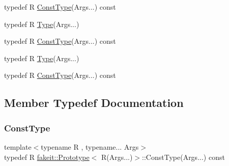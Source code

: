 \begin{DoxyCompactItemize}
\item 
typedef R \mbox{\hyperlink{structfakeit_1_1Prototype_3_01R_07Args_8_8_8_08_4_ae3e717bc1f9c549d4517139ae932049e}{Const\+Type}}(Args...) const
\item 
typedef R \mbox{\hyperlink{structfakeit_1_1Prototype_3_01R_07Args_8_8_8_08_4_ab60f23ae5c02a3a715e1b7d959a1f502}{Type}}(Args...)
\item 
typedef R \mbox{\hyperlink{structfakeit_1_1Prototype_3_01R_07Args_8_8_8_08_4_ae3e717bc1f9c549d4517139ae932049e}{Const\+Type}}(Args...) const
\item 
typedef R \mbox{\hyperlink{structfakeit_1_1Prototype_3_01R_07Args_8_8_8_08_4_ab60f23ae5c02a3a715e1b7d959a1f502}{Type}}(Args...)
\item 
typedef R \mbox{\hyperlink{structfakeit_1_1Prototype_3_01R_07Args_8_8_8_08_4_ae3e717bc1f9c549d4517139ae932049e}{Const\+Type}}(Args...) const
\end{DoxyCompactItemize}


\subsection{Member Typedef Documentation}
\mbox{\label{structfakeit_1_1Prototype_3_01R_07Args_8_8_8_08_4_ae3e717bc1f9c549d4517139ae932049e}} 
\subsubsection{\texorpdfstring{ConstType}{ConstType}\hspace{0.1cm}{\footnotesize\ttfamily [1/9]}}
{\footnotesize\ttfamily template$<$typename R , typename... Args$>$ \\
typedef R \mbox{\hyperlink{structfakeit_1_1Prototype}{fakeit\+::\+Prototype}}$<$ R(Args...)$>$\+::Const\+Type(Args...) const}

\mbox{\label{structfakeit_1_1Prototype_3_01R_07Args_8_8_8_08_4_ae3e717bc1f9c549d4517139ae932049e}} 

